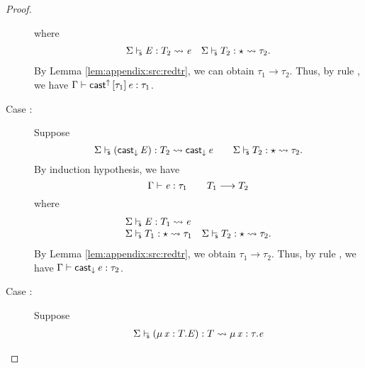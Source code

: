 \begin{proof}
\begin{description}
            where 
                \[
                \begin{array}{ll}
                 \Sigma  \vdash_{\!\!\mathsf{s} }  \mathit{E}  :  T_{{\mathrm{2}}}   \rightsquigarrow   \mathit{e}  &
                 \Sigma  \vdash_{\!\!\mathsf{s} }  T_{{\mathrm{2}}}  :  \star   \rightsquigarrow   \tau_{{\mathrm{2}}} .
                \end{array}
                \]
            By Lemma \ref{lem:appendix:src:redtr}, we can obtain $\tau_{{\mathrm{1}}}  \longrightarrow  \tau_{{\mathrm{2}}}$. Thus, by rule
            , we have $\Gamma  \vdash  \mathsf{cast}^{\uparrow} \, [  \tau_{{\mathrm{1}}}  ] \,  \mathit{e}  :  \tau_{{\mathrm{1}}}$.
        \item[Case \ruleref{TR\_CastDown}:] Suppose 
                \[  \Sigma  \vdash_{\!\!\mathsf{s} }  (  \mathsf{cast}_{\downarrow} \, \mathit{E}  )  :  T_{{\mathrm{2}}}   \rightsquigarrow   \mathsf{cast}_{\downarrow} \, \mathit{e}  \qquad
                 \Sigma  \vdash_{\!\!\mathsf{s} }  T_{{\mathrm{2}}}  :  \star   \rightsquigarrow   \tau_{{\mathrm{2}}} . \]
            By induction hypothesis, we have 
                \[
                    \Gamma  \vdash  \mathit{e}  :  \tau_{{\mathrm{1}}} \qquad
                    T_{{\mathrm{1}}}  \longrightarrow  T_{{\mathrm{2}}}
                \]
            where
                \[
                \begin{array}{ll}
                 \Sigma  \vdash_{\!\!\mathsf{s} }  \mathit{E}  :  T_{{\mathrm{1}}}   \rightsquigarrow   \mathit{e}  & \\
                 \Sigma  \vdash_{\!\!\mathsf{s} }  T_{{\mathrm{1}}}  :  \star   \rightsquigarrow   \tau_{{\mathrm{1}}}  &
                 \Sigma  \vdash_{\!\!\mathsf{s} }  T_{{\mathrm{2}}}  :  \star   \rightsquigarrow   \tau_{{\mathrm{2}}} .
                \end{array}
                \]
            By Lemma \ref{lem:appendix:src:redtr}, we obtain $\tau_{{\mathrm{1}}}  \longrightarrow  \tau_{{\mathrm{2}}}$. 
            Thus, by rule , we have $\Gamma  \vdash  \mathsf{cast}_{\downarrow} \, \mathit{e}  :  \tau_{{\mathrm{2}}}$.
        \item[Case \ruleref{TR\_Mu}:] Suppose 
                \[\begin{array}{l}
                     \Sigma  \vdash_{\!\!\mathsf{s} }  (  \mu \, \mathit{x}  :  T  .  \mathit{E}  )  :  T   \rightsquigarrow   \mu \, \mathit{x}  :  \tau  .  \mathit{e}  \\

\end{array}\]
\end{description}
\end{proof}
